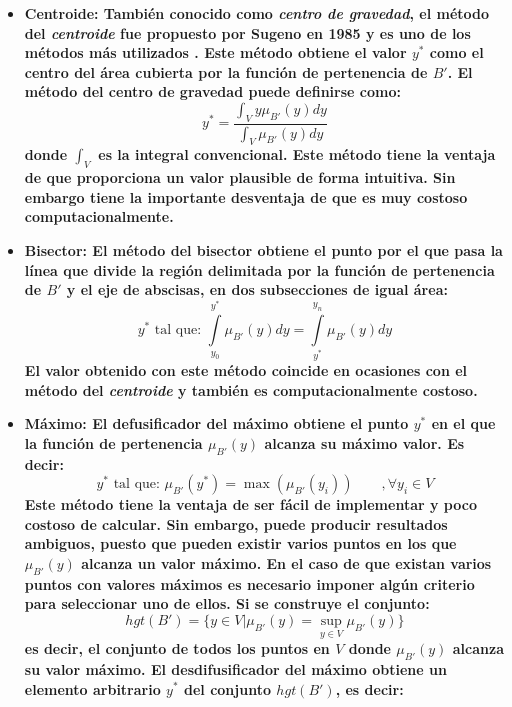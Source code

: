 \begin{itemize}
  \item\bfseries Centroide: \normalfont También conocido como \emph{centro de gravedad}, el método del \emph{centroide} fue propuesto por Sugeno en 1985 y es uno de los métodos más utilizados \cite{lee1990}. Este método obtiene el valor $y^*$ como el centro del área cubierta por la función de pertenencia de $B'$. El método del centro de gravedad puede definirse como:
  \begin{equation}
	y^* = \frac{\int_V y \mu_{B'}(y)dy}{\int_V \mu_{B'}(y)dy}
  \end{equation}
  donde $\int_V$ es la integral convencional. Este método tiene la ventaja de que proporciona un valor plausible de forma intuitiva. Sin embargo tiene la importante desventaja de que es muy costoso computacionalmente. 
  \item\bfseries Bisector: \normalfont El método del bisector obtiene el punto por el que pasa la línea que divide la región delimitada por la función de pertenencia de $B'$ y el eje de abscisas, en dos subsecciones de igual área:
  \begin{equation}
	y^*\text{ tal que: } \int\limits_{y_0}^{y^*}\mu_{B'}(y)dy = \int\limits_{y^*}^{y_n}\mu_{B'}(y)dy
  \end{equation}
  El valor obtenido con este método coincide en ocasiones con el método del \emph{centroide} y también es computacionalmente costoso.
  \item\bfseries Máximo: \normalfont El defusificador del máximo obtiene el punto $y^*$ en el que la función de pertenencia $\mu_{B'}(y)$ alcanza su máximo valor. Es decir:
  \begin{equation}
	y^*\text{ tal que: } \mu_{B'}(y^*) = \max(\mu_{B'}(y_{i}))\qquad ,\forall y_{i} \in V
  \end{equation}
  Este método tiene la ventaja de ser fácil de implementar y poco costoso de calcular. Sin embargo, puede producir resultados ambiguos, puesto que pueden existir varios puntos en los que $\mu_{B'}(y)$ alcanza un valor máximo. En el caso de que existan varios puntos con valores máximos es necesario imponer algún criterio para seleccionar uno de ellos. Si se construye el conjunto:
  \begin{equation}
	hgt(B') = \{y \in V | \mu_{B'}(y) = \sup\limits_{y \in V}\mu_{B'}(y)\}
  \end{equation}
  es decir, el conjunto de todos los puntos en $V$ donde $\mu_{B'}(y)$ alcanza su valor máximo. El desdifusificador del máximo obtiene un elemento arbitrario $y^*$ del conjunto $hgt(B')$, es decir:

\end{itemize}
